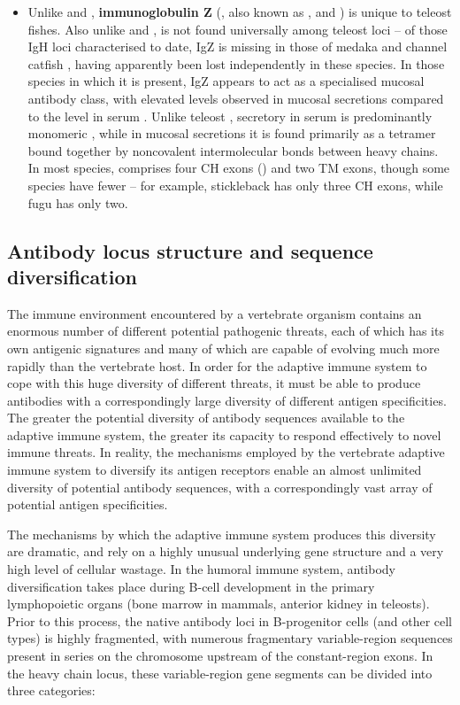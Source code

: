 \begin{itemize}
\item Unlike  and , \textbf{immunoglobulin Z} (, also known as ,  and ) is unique to teleost fishes. Also unlike  and ,  is not found universally among teleost loci -- of those IgH loci characterised to date, IgZ is missing in those of medaka %
and channel catfish %
\citep{fillatreau2013astonishing} , having apparently been lost independently in these species. In those species in which it is present, IgZ appears to act as a specialised mucosal antibody class, with elevated levels observed in mucosal secretions compared to the level in serum \citep{fillatreau2013astonishing} %
. Unlike teleost , secretory  in serum is predominantly monomeric %
, while in mucosal secretions it is found primarily as a tetramer bound together by noncovalent intermolecular bonds between heavy chains.
In most species,  comprises four CH exons () and two TM exons, though some species have fewer -- for example, stickleback  has only three CH exons, while fugu  has only two.
\end{itemize}

\subsection{Antibody locus structure and sequence diversification}

The immune environment encountered by a vertebrate organism contains an enormous number of different potential pathogenic threats, each of which has its own antigenic signatures and many of which are capable of evolving much more rapidly than the vertebrate host. In order for the adaptive immune system to cope with this huge diversity of different threats, it must be able to produce antibodies with a correspondingly large diversity of different antigen specificities. The greater the potential diversity of antibody sequences available to the adaptive immune system, the greater its capacity to respond effectively to novel immune threats. In reality, the mechanisms employed by the vertebrate adaptive immune system to diversify its antigen receptors enable an almost unlimited diversity of potential antibody sequences, with a correspondingly vast array of potential antigen specificities.

The mechanisms by which the adaptive immune system produces this diversity are dramatic, and rely on a highly unusual underlying gene structure and a very high level of cellular wastage. In the humoral immune system, antibody diversification takes place during B-cell development in the primary lymphopoietic organs (bone marrow in mammals, anterior kidney in teleosts). Prior to this process, the native antibody loci in B-progenitor cells (and other cell types) is highly fragmented, with numerous fragmentary variable-region sequences present in series on the chromosome upstream of the constant-region exons. In the heavy chain locus, these variable-region gene segments can be divided into three categories:

